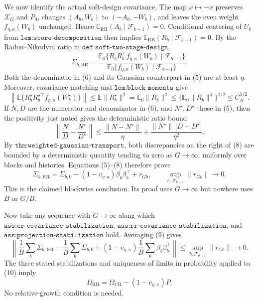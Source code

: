 We now identify the actual soft-design covariance.  The map \(x\mapsto-x\) preserves \(\mathcal X_G\) and \(P_0\), changes \((A_b,W_b)\) to \((-A_b,-W_b)\), and leaves the even weight \(f_{\eta,\kappa}(W_b)\) unchanged.  Hence \(\mathbb E_{\mathrm{RR}}(A_b\mid\mathcal F_{b-1})=0\).  Conditional centering of \(U_b\) from \(\texttt{lem:score-decomposition}\) then implies \(\mathbb E_{\mathrm{RR}}(R_b\mid\mathcal F_{b-1})=0\).  By the Radon--Nikodym ratio in \(\texttt{def:soft-two-stage-design}\),
\[
 \Sigma_{b,\mathrm{RR}}
 =\frac{\mathbb E_0\{R_bR_b^\top f_{\eta,\kappa}(W_b)
                         \mid\mathcal F_{b-1}\}}
        {\mathbb E_0\{f_{\eta,\kappa}(W_b)
                         \mid\mathcal F_{b-1}\}}.          \tag{6}
\]
Both the denominator in (6) and its Gaussian counterpart in (5) are at least \(\eta\).  Moreover, covariance matching and \(\texttt{lem:block-moments}\) give
\[
 \left\|\mathbb E\{R_b^\star R_b^{\star\top}
                         f_{\eta,\kappa}(W_b^\star)\}\right\|
 \leq\mathbb E\|R_b^\star\|^2
 =\mathbb E_0\|R_b\|^2
 \leq\{\mathbb E_0\|R_b\|^4\}^{1/2}\leq C_R^{1/2}.     \tag{7}
\]
If \(N,D\) are the numerator and denominator in (6), and \(N^\star,D^\star\) those in (5), then the positivity just noted gives the deterministic ratio bound
\[
 \left\|\frac ND-\frac{N^\star}{D^\star}\right\|
 \leq\frac{\|N-N^\star\|}{\eta}
     +\frac{\|N^\star\|\,|D-D^\star|}{\eta^2}.            \tag{8}
\]
By \(\texttt{thm:weighted-gaussian-transport}\), both discrepancies on the right of (8) are bounded by a deterministic quantity tending to zero as \(G\to\infty\), uniformly over blocks and histories.  Equations (5)--(8) therefore prove
\[
 \Sigma_{b,\mathrm{RR}}
 =\Sigma_{b,0}-(1-v_{\eta,\kappa})\beta_b\beta_b^\top+r_{Gb},
 \qquad
 \sup_{b,\mathcal F_{b-1}}\|r_{Gb}\|\longrightarrow0.     \tag{9}
\]
This is the claimed blockwise conclusion.  Its proof uses \(G\to\infty\) but nowhere uses \(B\) or \(G/B\).

Now take any sequence with \(G\to\infty\) along which \(\texttt{ass:cr-covariance-stabilization}\), \(\texttt{ass:rr-covariance-stabilization}\), and \(\texttt{ass:projection-stabilization}\) hold.  Averaging (9) gives
\[
 \left\|\frac1B\sum_b\Sigma_{b,\mathrm{RR}}
 -\frac1B\sum_b\Sigma_{b,0}
 +(1-v_{\eta,\kappa})\frac1B\sum_b\beta_b\beta_b^\top\right\|
 \leq\sup_{b,\mathcal F_{b-1}}\|r_{Gb}\|\longrightarrow0. \tag{10}
\]
The three stated stabilizations and uniqueness of limits in probability applied to (10) imply
\[
 \Omega_{\mathrm{RR}}
 =\Omega_{\mathrm{CR}}-(1-v_{\eta,\kappa})P.               \tag{11}
\]
No relative-growth condition is needed.

